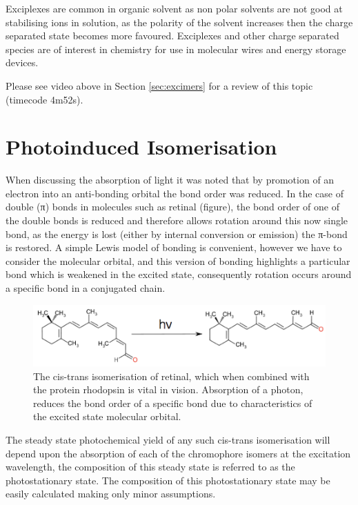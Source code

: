 \documentclass[
]{book}
\begin{document}
Exciplexes are common in organic solvent as non polar solvents are not good at stabilising ions in solution, as the polarity of the solvent increases then the charge separated state becomes more favoured. Exciplexes and other charge separated species are of interest in chemistry for use in molecular wires and energy storage devices.

Please see video above in Section \ref{sec:excimers} for a review of this topic (timecode 4m52s).

\hypertarget{sec:photoinducedisom}{%
\section{Photoinduced Isomerisation}\label{sec:photoinducedisom}}

When discussing the absorption of light it was noted that by promotion of an electron into an anti-bonding orbital the bond order was reduced. In the case of double (π) bonds in molecules such as retinal (figure), the bond order of one of the double bonds is reduced and therefore allows rotation around this now single bond, as the energy is lost (either by internal conversion or emission) the π-bond is restored. A simple Lewis model of bonding is convenient, however we have to consider the molecular orbital, and this version of bonding highlights a particular bond which is weakened in the excited state, consequently rotation occurs around a specific bond in a conjugated chain.

\begin{figure}

{\centering \includegraphics[width=0.7\linewidth]{images/retinal} 

}

\caption{The cis-trans isomerisation of retinal, which when combined with the protein rhodopsin is vital in vision. Absorption of a photon, reduces the bond order of a specific bond due to characteristics of the excited state molecular orbital.}\label{fig:retinal}
\end{figure}

The steady state photochemical yield of any such cis-trans isomerisation will depend upon the absorption of each of the chromophore isomers at the excitation wavelength, the composition of this steady state is referred to as the photostationary state. The composition of this photostationary state may be easily calculated making only minor assumptions.
\end{document}
